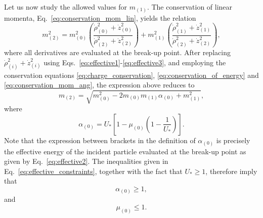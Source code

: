 Let us now study the allowed values for $m_{(1)}$. The conservation of linear momenta, Eq.~\eqref{eq:conservation_mom_lin}, yields the relation
\begin{equation} \label{eq:mass2_eq1}
    m_{(2)}^2  = m_{(0)}^2 \left( \frac{\dot \rho_{(0)} ^2 +  \dot z_{(0)} ^2 }{\dot \rho_{(2)} ^2 + \dot z_{(2)} ^2 } \right) + m_{(1)}^2 \left( \frac{\dot \rho_{(1)} ^2 + \dot z_{(1)} ^2 }{\dot \rho_{(2)} ^2 + \dot z_{(2)} ^2 } \right),
\end{equation}
where all derivatives are evaluated at the break-up point.
After replacing $\dot \rho_{(i)} ^2 + \dot z_{(i)} ^2$ using Eqs.~\eqref{eq:effective1}-\eqref{eq:effective3}, and employing the conservation equations  \eqref{eq:charge_conservation}, \eqref{eq:conservation_of_energy} and \eqref{eq:conservation_mom_ang}, the expression above reduces to
\begin{equation} \label{eq:mass2_eq2}
    m_{(2)} = \sqrt{m_{(0)}^2 - 2 m_{(0)} m_{(1)} \alpha_{(0)} + m_{(1)}^2},
\end{equation}
where
\begin{equation} \label{eq:alpha_definition}
    \alpha_{(0)} =  U_* \left[ 1 - \mu_{(0)}\left(1 - \frac{1}{U_*}\right) \right].
\end{equation}
Note that the expression between brackets in the definition of $\alpha_{(0)}$ is precisely the effective energy of the incident particle evaluated at the break-up point as given by Eq.~\eqref{eq:effective2}. The inequalities given in Eq.~\eqref{eq:effective_constraints}, together with the fact that $U_* \ge 1$, therefore imply that
\begin{equation} \label{eq:alpha_constraint}
    \alpha_{(0)} \ge 1,
\end{equation}
and
\begin{equation} \label{eq:mu0max}
    \mu_{(0)} \le 1.
\end{equation}

